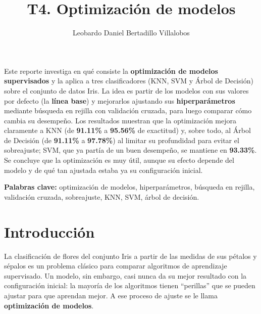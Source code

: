 \documentclass[11pt,letterpaper,twoside]{article}
\title{T4. Optimización de modelos}
\author{Leobardo Daniel Bertadillo Villalobos}
\begin{document}
\parindent=0mm

\newpage

\setcounter{page}{1}

\begin{tcolorbox}[
    enhanced, colback=fondoclaro, colframe=azulutez, coltitle=white,
    fonttitle=\large\bfseries, title=Resumen, boxrule=1.5pt, arc=3mm,
    left=10pt, right=10pt, top=8pt, bottom=8pt
]
\noindent Este reporte investiga en qué consiste la \textbf{optimización de modelos supervisados} y la aplica a tres clasificadores (KNN, SVM y Árbol de Decisión) sobre el conjunto de datos Iris. La idea es partir de los modelos con sus valores por defecto (la \textbf{línea base}) y mejorarlos ajustando sus \textbf{hiperparámetros} mediante búsqueda en rejilla con validación cruzada, para luego comparar cómo cambia su desempeño. Los resultados muestran que la optimización mejora claramente a KNN (de \textbf{91.11\%} a \textbf{95.56\%} de exactitud) y, sobre todo, al Árbol de Decisión (de \textbf{91.11\%} a \textbf{97.78\%}) al limitar su profundidad para evitar el sobreajuste; SVM, que ya partía de un buen desempeño, se mantiene en \textbf{93.33\%}. Se concluye que la optimización es muy útil, aunque su efecto depende del modelo y de qué tan ajustada estaba ya su configuración inicial.

\vspace{0.4cm}
\textcolor{azulutez}{\textbf{Palabras clave:}} optimización de modelos, hiperparámetros, búsqueda en rejilla, validación cruzada, sobreajuste, KNN, SVM, árbol de decisión.
\end{tcolorbox}
\newpage

\renewcommand{\contentsname}{Índice}
\tableofcontents
\newpage

\setcounter{page}{1}

\section{Introducción}
\label{sec:introduccion}
La clasificación de flores del conjunto Iris a partir de las medidas de sus pétalos y sépalos es un problema clásico para comparar algoritmos de aprendizaje supervisado. Un modelo, sin embargo, casi nunca da su mejor resultado con la configuración inicial: la mayoría de los algoritmos tienen ``perillas'' que se pueden ajustar para que aprendan mejor. A ese proceso de ajuste se le llama \textbf{optimización de modelos}.
\end{document}
